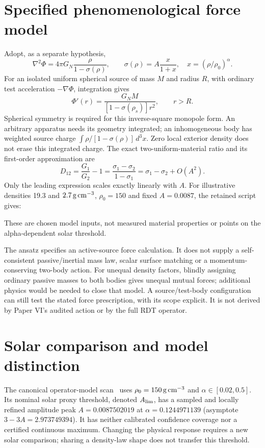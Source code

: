 \documentclass[11pt,a4paper]{article}
\newcommand{\GN}{G_N}
\begin{document}
\section{Specified phenomenological force model}
Adopt, as a separate hypothesis,
\begin{equation}
 \nabla^2\Phi=4\pi\GN\frac{\rho}{1-\sigma(\rho)},\qquad
 \sigma(\rho)=A\frac{x}{1+x},\quad x=(\rho/\rho_0)^\alpha.
\end{equation}
For an isolated uniform spherical source of mass $M$ and radius $R$, with
ordinary test acceleration $-\nabla\Phi$, integration gives
\begin{equation}
 \Phi'(r)=\frac{\GN M}{[1-\sigma(\rho_s)]r^2},\qquad r>R.
\end{equation}
Spherical symmetry is required for this inverse-square monopole form.
An arbitrary apparatus needs its geometry integrated; an inhomogeneous body
has weighted source charge $\int \rho/[1-\sigma(\rho)]\,d^3x$.
Zero local exterior density does not erase this integrated charge.
The exact two-uniform-material ratio and its first-order approximation are
\begin{equation}
 D_{12}=\frac{G_1}{G_2}-1
 =\frac{\sigma_1-\sigma_2}{1-\sigma_1}
 =\sigma_1-\sigma_2+O(A^2).
\end{equation}
Only the leading expression scales exactly linearly with $A$.
For illustrative densities 19.3 and $2.7\,{\rm g\,cm^{-3}}$, $\rho_0=150$
and fixed $A=0.0087$, the retained script gives:
\begin{center}

\end{center}
These are chosen model inputs, not measured material properties or points
on the alpha-dependent solar threshold.

The ansatz specifies an active-source force calculation. It does not supply
a self-consistent passive/inertial mass law, scalar surface matching or a
momentum-conserving two-body action. For unequal density factors, blindly
assigning ordinary passive masses to both bodies gives unequal mutual forces;
additional physics would be needed to close that model. A source/test-body
configuration can still test the stated force prescription, with its scope
explicit. It is not derived by Paper VI's audited action or by the full RDT
operator.

\section{Solar comparison and model distinction}
The canonical operator-model scan~\cite{Series_paper1} uses $\rho_0=150\,{\rm g\,cm^{-3}}$
and $\alpha\in[0.02,0.5]$. Its nominal solar proxy threshold, denoted
$A_{\rm lim}$, has a sampled and locally refined amplitude peak
$A=0.0087502019$ at $\alpha=0.1244971139$ (asymptote $3-3A=2.973749394$).
It has neither calibrated confidence coverage nor a certified continuous
maximum. Changing the physical response requires a new solar comparison;
sharing a density-law shape does not transfer this threshold.
\end{document}

